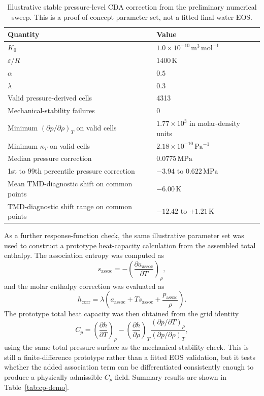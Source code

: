 \documentclass[12pt]{article}
\begin{document}
\begin{table}[htbp]
\centering
\caption{Illustrative stable pressure-level CDA correction from the preliminary numerical sweep. This is a proof-of-concept parameter set, not a fitted final water EOS.}
\label{tab:numeric-demo}
\begin{tabular}{@{}ll@{}}
\toprule
Quantity & Value \\
\midrule
$K_0$ & $1.0\times10^{-10}\,\mathrm{m^3\,mol^{-1}}$ \\
$\varepsilon/R$ & $1400\,\mathrm{K}$ \\
$\alpha$ & $0.5$ \\
$\lambda$ & $0.3$ \\
Valid pressure-derived cells & 4313 \\
Mechanical-stability failures & 0 \\
Minimum $(\partial p/\partial\rho)_T$ on valid cells & $1.77\times10^3$ in molar-density units \\
Minimum $\kappa_T$ on valid cells & $2.18\times10^{-10}\,\mathrm{Pa^{-1}}$ \\
Median pressure correction & $0.0775\,\mathrm{MPa}$ \\
1st to 99th percentile pressure correction & $-3.94$ to $0.622\,\mathrm{MPa}$ \\
Mean TMD-diagnostic shift on common points & $-6.00\,\mathrm{K}$ \\
TMD-diagnostic shift range on common points & $-12.42$ to $+1.21\,\mathrm{K}$ \\
\bottomrule
\end{tabular}
\end{table}


As a further response-function check, the same illustrative parameter set was used to construct a prototype heat-capacity calculation from the assembled total enthalpy. The association entropy was computed as
\begin{equation}
  s_{\mathrm{assoc}}=-\left(\frac{\partial a_{\mathrm{assoc}}}{\partial T}\right)_\rho,
\end{equation}
and the molar enthalpy correction was evaluated as
\begin{equation}
  h_{\mathrm{corr}}
  =\lambda\left(a_{\mathrm{assoc}}+T s_{\mathrm{assoc}}
  +\frac{p_{\mathrm{assoc}}}{\rho}\right).
\end{equation}
The prototype total heat capacity was then obtained from the grid identity
\begin{equation}
  C_p
  =\left(\frac{\partial h}{\partial T}\right)_\rho
  -\left(\frac{\partial h}{\partial \rho}\right)_T
  \frac{(\partial p/\partial T)_\rho}{(\partial p/\partial\rho)_T},
\end{equation}
using the same total pressure surface as the mechanical-stability check. This is still a finite-difference prototype rather than a fitted EOS validation, but it tests whether the added association term can be differentiated consistently enough to produce a physically admissible $C_p$ field. Summary results are shown in Table~\ref{tab:cp-demo}.
\end{document}
